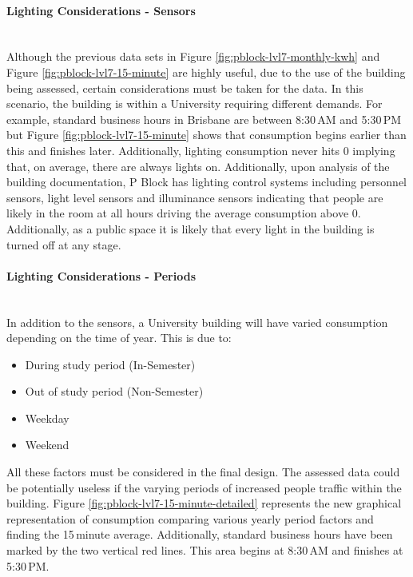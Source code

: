 \paragraph{Lighting Considerations - Sensors}
~\\
Although the previous data sets in Figure \ref{fig:pblock-lvl7-monthly-kwh} and Figure \ref{fig:pblock-lvl7-15-minute} are highly useful, due to the use of the building being assessed, certain considerations must be taken for the data. In this scenario, the building is within a University requiring different demands. For example, standard business hours in Brisbane are between 8:30\,AM and 5:30\,PM but Figure \ref{fig:pblock-lvl7-15-minute} shows that consumption begins earlier than this and finishes later. Additionally, lighting consumption never hits 0 implying that, on average, there are always lights on. Additionally, upon analysis of the building documentation, P Block has lighting control systems including personnel sensors, light level sensors and illuminance sensors indicating that people are likely in the room at all hours driving the average consumption above 0. Additionally, as a public space it is likely that every light in the building is turned off at any stage. 

\paragraph{Lighting Considerations - Periods}
~\\
In addition to the sensors, a University building will have varied consumption depending on the time of year. This is due to:
\newline
\begin{itemize} [noitemsep]
	\item During study period (In-Semester)
	\item Out of study period (Non-Semester)
	\item Weekday
	\item Weekend
\end{itemize}

All these factors must be considered in the final design. The assessed data could be potentially useless if the varying periods of increased people traffic within the building. Figure \ref {fig:pblock-lvl7-15-minute-detailed} represents the new graphical representation of consumption comparing various yearly period factors and finding the 15\,minute average. Additionally, standard business hours have been marked by the two vertical red lines. This area begins at 8:30\,AM and finishes at 5:30\,PM.  

